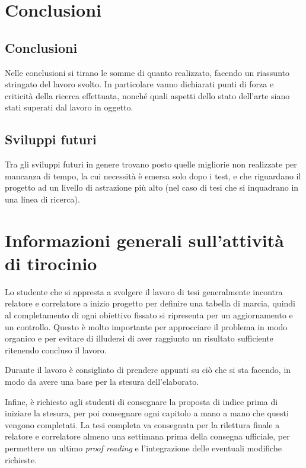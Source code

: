 \documentclass[12pt]{report}
\begin{document}
    \chapter{Conclusioni}
    \label{cap6}

    \section{Conclusioni}

    Nelle conclusioni si tirano le somme di quanto realizzato, facendo un riassunto stringato del lavoro svolto. In particolare vanno dichiarati punti di forza e criticità della ricerca effettuata, nonché quali aspetti dello stato dell'arte siano stati superati dal lavoro in oggetto.

    \section{Sviluppi futuri}

    Tra gli sviluppi futuri in genere trovano posto quelle migliorie non realizzate per mancanza di tempo, la cui necessità è emersa solo dopo i test, e che riguardano il progetto ad un livello di astrazione più alto (nel caso di tesi che si inquadrano in una linea di ricerca).


%
%

    \appendix

    \chapter{Informazioni generali sull'attività di tirocinio}
    Lo studente che si appresta a svolgere il lavoro di tesi generalmente incontra relatore e correlatore a inizio progetto per definire una tabella di marcia, quindi al completamento di ogni obiettivo fissato si ripresenta per un aggiornamento e un controllo. Questo è molto importante per approcciare il problema in modo organico e per evitare di illudersi di aver raggiunto un risultato sufficiente ritenendo concluso il lavoro.

    Durante il lavoro è consigliato di prendere appunti su ciò che si sta facendo, in modo da avere una base per la stesura dell'elaborato.

    Infine, è richiesto agli studenti di consegnare la proposta di indice prima di iniziare la stesura, per poi consegnare ogni capitolo a mano a mano che questi vengono completati. La tesi completa va consegnata per la rilettura finale a relatore e correlatore almeno una settimana prima della consegna ufficiale, per permettere un ultimo \textit{proof reading} e l'integrazione delle eventuali modifiche richieste.
\end{document}
